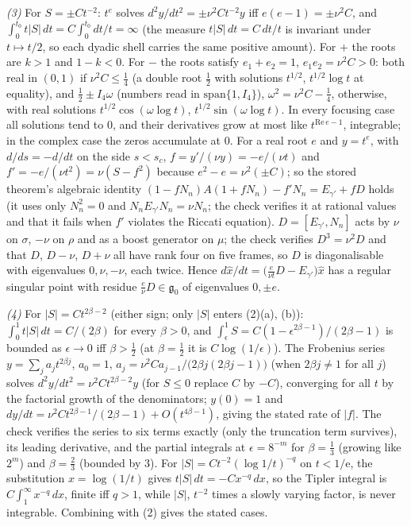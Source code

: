 \emph{(3)} For $S = \pm Ct^{-2}$: $t^{e}$ solves $d^2y/dt^2 = \pm\nu^2Ct^{-2}y$ iff $e(e - 1) = \pm\nu^2 C$, and $\int_0^{t_0} t|S|\,dt = C\int_0^{t_0}dt/t = \infty$ (the measure $t|S|\,dt = C\,dt/t$ is invariant under $t \mapsto t/2$, so each dyadic shell carries the same positive amount). For $+$ the roots are $k > 1$ and $1 - k < 0$. For $-$ the roots satisfy $e_1 + e_2 = 1$, $e_1e_2 = \nu^2 C > 0$: both real in $(0, 1)$ if $\nu^2 C \le \tfrac14$ (a double root $\tfrac12$ with solutions $t^{1/2}$, $t^{1/2}\log t$ at equality), and $\tfrac12 \pm I_{4}\omega$ (numbers read in $\mathrm{span}\{1, I_{4}\}$), $\omega^2 = \nu^2 C - \tfrac14$, otherwise, with real solutions $t^{1/2}\cos(\omega\log t)$, $t^{1/2}\sin(\omega\log t)$. In every focusing case all solutions tend to $0$, and their derivatives grow at most like $t^{\mathrm{Re}\,e - 1}$, integrable; in the complex case the zeros accumulate at $0$. For a real root $e$ and $y = t^e$, with $d/ds = -d/dt$ on the side $s < s_c$, $f = y'/(\nu y) = -e/(\nu t)$ and $f' = -e/(\nu t^2) = \nu(S - f^2)$ because $e^2 - e = \nu^2(\pm C)$; so the stored theorem's algebraic identity $(1 - fN_n)A(1 + fN_n) - f'N_n = E_{\gamma'} + fD$ holds (it uses only $N_n^2 = 0$ and $N_nE_{\gamma'}N_n = \nu N_n$; the check verifies it at rational values and that it fails when $f'$ violates the Riccati equation). $D = [E_{\gamma'}, N_n]$ acts by $\nu$ on $\sigma$, $-\nu$ on $\rho$ and as a boost generator on $\mu$; the check verifies $D^3 = \nu^2 D$ and that $D$, $D - \nu$, $D + \nu$ all have rank four on five frames, so $D$ is diagonalisable with eigenvalues $0, \nu, -\nu$, each twice. Hence $d\hat x/dt = \bigl(\tfrac{e}{\nu t}D - E_{\gamma'}\bigr)\hat x$ has a regular singular point with residue $\tfrac{e}{\nu}D \in \mathfrak g_0$ of eigenvalues $0, \pm e$.

\emph{(4)} For $|S| = Ct^{2\beta - 2}$ (either sign; only $|S|$ enters (2)(a), (b)): $\int_0^1 t|S|\,dt = C/(2\beta)$ for every $\beta > 0$, and $\int_\epsilon^1 S = C(1 - \epsilon^{2\beta - 1})/(2\beta - 1)$ is bounded as $\epsilon \to 0$ iff $\beta > \tfrac12$ (at $\beta = \tfrac12$ it is $C\log(1/\epsilon)$). The Frobenius series $y = \sum_j a_j t^{2\beta j}$, $a_0 = 1$, $a_j = \nu^2 C a_{j-1}/\bigl(2\beta j(2\beta j - 1)\bigr)$ (when $2\beta j \neq 1$ for all $j$) solves $d^2y/dt^2 = \nu^2 C t^{2\beta - 2} y$ (for $S \le 0$ replace $C$ by $-C$), converging for all $t$ by the factorial growth of the denominators; $y(0) = 1$ and $dy/dt = \nu^2 C t^{2\beta - 1}/(2\beta - 1) + O(t^{4\beta - 1})$, giving the stated rate of $|f|$. The check verifies the series to six terms exactly (only the truncation term survives), its leading derivative, and the partial integrals at $\epsilon = 8^{-m}$ for $\beta = \tfrac13$ (growing like $2^m$) and $\beta = \tfrac23$ (bounded by $3$). For $|S| = Ct^{-2}(\log 1/t)^{-q}$ on $t < 1/\mathrm{e}$, the substitution $x = \log(1/t)$ gives $t|S|\,dt = -Cx^{-q}\,dx$, so the Tipler integral is $C\int_1^\infty x^{-q}\,dx$, finite iff $q > 1$, while $|S|$, $t^{-2}$ times a slowly varying factor, is never integrable. Combining with (2) gives the stated cases.
